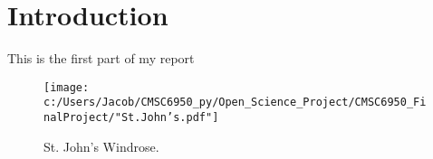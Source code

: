 \documentclass{article}
\begin{document}
\section{Introduction}
This is the first part of my report

\begin{figure}[h!]
\texttt{[image: c:/Users/Jacob/CMSC6950\_py/Open\_Science\_Project/CMSC6950\_FinalProject/"St.John's.pdf"]}
\label{St._John's_Windrose}
\caption{St. John's Windrose.}
\end{figure}
\end{document}
